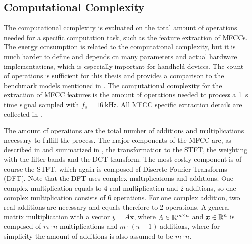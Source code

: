 
\subsection{Computational Complexity}
The computational complexity is evaluated on the total amount of operations needed for a specific computation task, such as the feature extraction of MFCCs.
The energy consumption is related to the computational complexity, but it is much harder to define and depends on many parameters and actual hardware implementations, which is especially important for handheld devices.
The count of operations is sufficient for this thesis and provides a comparison to the benchmark models mentioned in .
The computational complexity for the extraction of MFCC features is the amount of operations needed to process a \SI{1}{\second} time signal sampled with $f_s = \SI{16}{\kilo\hertz}$.
All MFCC specific extraction details are collected in .

The amount of operations are the total number of additions and multiplications necessary to fulfill the process.
The major components of the MFCC are, as described in  and summarized in , the transformation to the STFT, the weighting with the filter bands and the DCT transform.
The most costly component is of course the STFT, which again is composed of Discrete Fourier Transforms (DFT).
Note that the DFT uses complex multiplications and additions.
One complex multiplication equals to 4 real multiplication and 2 additions, so one complex multiplication consists of 6 operations.
For one complex addition, two real additions are necessary and equals therefore to 2 operations.
A general matrix multiplication with a vector $y = A \bm{x}$, where $A \in \mathbb{R}^{m \times n}$ and $\bm{x} \in \mathbb{R}^n$ is composed of $m \cdot n$ multiplications and $m \cdot (n - 1)$ additions, where for simplicity the amount of additions is also assumed to be $m \cdot n$.

